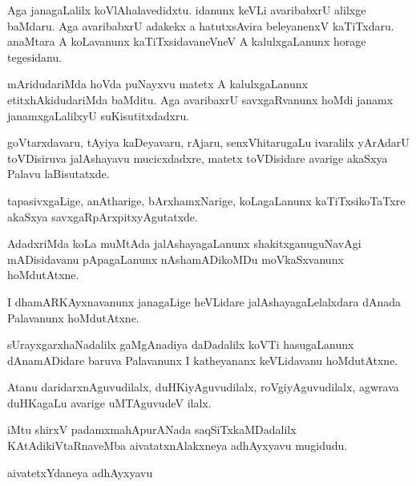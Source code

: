 \documentclass{article}
\begin{document}
\begin{mng}%
Aga janagaLalilx koVlAhalavedidxtu. idanunx keVLi avaribabxrU alilxge 
baMdaru. Aga avaribabxrU adakekx a hatutxsAvira beleyanenxV kaTiTxdaru. 
anaMtara A koLavanunx kaTiTxsidavaneVneV A kalulxgaLanunx horage 
tegesidanu.
\end{mng}

\begin{mng}%
mAridudariMda hoVda puNayxvu matetx A kalulxgaLanunx 
etitxhAkidudariMda baMditu. Aga avaribaxrU savxgaRvanunx hoMdi janamx 
janamxgaLalilxyU suKisutitxdadxru.
\end{mng}

\begin{mng}%
goVtarxdavaru, tAyiya kaDeyavaru, rAjaru, senxVhitarugaLu ivaralilx 
yArAdarU toVDisiruva jalAshayavu mucicxdadxre, matetx toVDisidare 
avarige akaSxya Palavu laBisutatxde.
\end{mng}

\begin{mng}%
tapasivxgaLige, anAtharige, bArxhamxNarige, koLagaLanunx 
kaTiTxsikoTaTxre akaSxya savxgaRpArxpitxyAgutatxde.
\end{mng}

\begin{mng}%
AdadxriMda koLa muMtAda jalAshayagaLanunx shakitxganuguNavAgi 
mADisidavanu pApagaLanunx nAshamADikoMDu moVkaSxvanunx hoMdutAtxne.
\end{mng}

\begin{mng}%
I dhamARKAyxnavanunx janagaLige heVLidare jalAshayagaLelalxdara dAnada 
Palavanunx hoMdutAtxne.
\end{mng}

\begin{mng}%
sUrayxgarxhaNadalilx gaMgAnadiya daDadalilx koVTi hasugaLanunx 
dAnamADidare baruva Palavanunx I katheyananx keVLidavanu hoMdutAtxne.
\end{mng}

\begin{mng}%
Atanu daridarxnAguvudilalx, duHKiyAguvudilalx, roVgiyAguvudilalx, 
agwrava duHKagaLu avarige uMTAguvudeV ilalx.
\end{mng}

\begin{center}
iMtu shirxV padamxmahApurANada saqSiTxkaMDadalilx KAtAdikiVtaRnaveMba
aivatatxnAlakxneya adhAyxyavu mugidudu.
\end{center}

\begin{center}
{\textbf\large{aivatetxYdaneya adhAyxyavu}}
\end{center}
\end{document}
